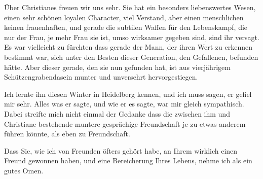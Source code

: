 \pstart
           Über Christianes\label{K_L02503-3v}\label{K_L02503-3} freuen wir uns sehr. Sie
               hat ein besonders liebenswertes Wesen, einen sehr schönen loyalen Character, viel
               Verstand, aber einen menschlichen keinen frauenhaften, und gerade die subtilen Waffen
               für den Lebenskampf, die nur der Frau, je mehr Frau sie ist, umso wirksamer gegeben
               sind, sind ihr versagt. Es war vielleicht zu fürchten dass gerade der Mann, der ihren
               Wert zu erkennen bestimmt war, sich unter den Besten dieser Generation, den
               Gefallenen, befunden hätte. Aber dieser gerade, den sie nun gefunden hat, ist aus vierjährigem
               Schützengrabendasein munter und unversehrt hervorgestiegen.\pend
           
\pstart
           Ich lernte ihn diesen Winter in Heidelberg kennen, und ich muss sagen, er gefiel mir sehr. Alles was er
               sagte, und wie er es sagte, war mir gleich sympathisch. Dabei streifte mich nicht
               einmal der Gedanke dass die {\pb}zwischen ihm und Christiane bestehende
               muntere gesprächige Freundschaft je zu etwas anderem führen könnte, als eben zu
               Freundschaft.\pend
           
\pstart
           Dass Sie, wie ich von Freunden öfters gehört habe, an Ihrem \label{K_L02503-4v}\label{K_L02503-4} wirklich einen Freund
               gewonnen haben, und eine Bereicherung Ihres Lebens, nehme ich als ein gutes Omen.\pend
           
